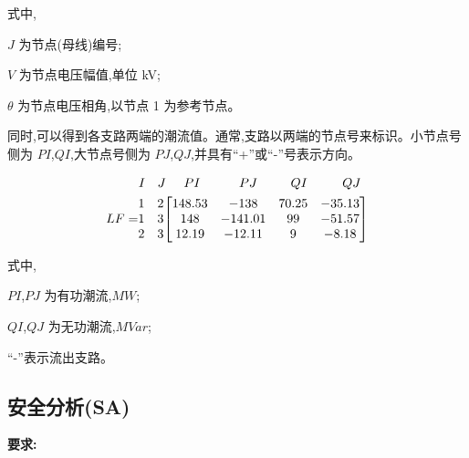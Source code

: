 \documentclass[a4paper]{ctexrep}
\begin{document}
                    式中,

                    \quad $J$ 为节点(母线)编号;

                    \quad $V$ 为节点电压幅值,单位 kV;

                    \quad $\theta$ 为节点电压相角,以节点 1 为参考节点。

                    同时,可以得到各支路两端的潮流值。通常,支路以两端的节点号来标识。小节点号侧为 $PI$,$QI$,大节点号侧为 $PJ$,$QJ$,并具有“+”或“-”号表示方向。

                    \begin{equation}
                        \begin{aligned}
                            & {\hspace{-0.2cm}\begin{tabular}{p{0.1cm} p{0.3cm} p{1.1cm} p{1cm} p{1cm} l}
                                $I$ & $J$ & $PI$ & $PJ$ & $QI$ & $QJ$ \\
                            \end{tabular}} \\
                            LF= & {\begin{matrix}
                                1 & 2 \\
                                1 & 3 \\
                                2 & 3 \\
                            \end{matrix}} {\left[\begin{matrix}
                                148.53 & -138 & 70.25 & -35.13 \\
                                148 & -141.01 & 99 & -51.57 \\
                                12.19 & -12.11 & 9 & -8.18 \\
                            \end{matrix} \right]}
                        \end{aligned}
                    \end{equation}

                    式中,
                    
                    \quad $PI$,$PJ$ 为有功潮流,$MW$;

                    \quad $QI$,$QJ$ 为无功潮流,$MVar$;

                    \quad “-”表示流出支路。

                \subsection{安全分析(SA)}
                    \textbf{要求:}
\end{document}
